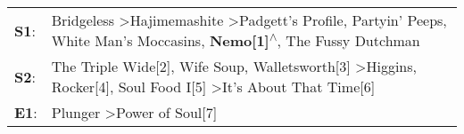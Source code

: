 \begin{supertabular}{p{0.03\textwidth}p{0.92\textwidth}}
 \textbf{S1}:  &  Bridgeless\textsuperscript{} \textgreater \enspace Hajimemashite\textsuperscript{} \textgreater \enspace Padgett's Profile\textsuperscript{}, \enspace Partyin' Peeps\textsuperscript{}, \enspace White Man's Moccasins\textsuperscript{}, \enspace \textbf{Nemo[1]\textsuperscript{$\wedge$}}, \enspace The Fussy Dutchman\textsuperscript{}  \enspace  \\
 \textbf{S2}:  &                        The Triple Wide[2]\textsuperscript{}, \enspace Wife Soup\textsuperscript{}, \enspace Walletsworth[3]\textsuperscript{} \textgreater \enspace Higgins\textsuperscript{}, \enspace Rocker[4]\textsuperscript{}, \enspace Soul Food I[5]\textsuperscript{} \textgreater \enspace It's About That Time[6]\textsuperscript{}  \enspace  \\
 \textbf{E1}:  &                                                                                                                                                                                                                                                             Plunger\textsuperscript{} \textgreater \enspace Power of Soul[7]\textsuperscript{}  \enspace  \\
\end{supertabular}
